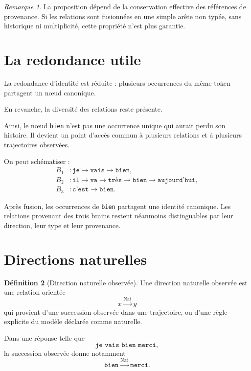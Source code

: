 \documentclass[11pt,a4paper]{report}
\theoremstyle{definition}
\newtheorem{definition}{Définition}[chapter]
\theoremstyle{plain}
\theoremstyle{remark}
\newtheorem{remarque}[definition]{Remarque}
\begin{document}
\begin{remarque}
La proposition dépend de la conservation effective des références
de provenance. Si les relations sont fusionnées en une simple
arête non typée, sans historique ni multiplicité, cette propriété
n'est plus garantie.
\end{remarque}

\section{La redondance utile}

La redondance d'identité est réduite :
plusieurs occurrences du même token partagent un nœud canonique.

En revanche, la diversité des relations reste présente.

Ainsi, le nœud \texttt{bien} n'est pas une occurrence unique
qui aurait perdu son histoire. Il devient un point d'accès commun
à plusieurs relations et à plusieurs trajectoires observées.

On peut schématiser :
\[
\begin{aligned}
B_1 &: \texttt{je}\to\texttt{vais}\to\texttt{bien},\\
B_2 &: \texttt{il}\to\texttt{va}\to\texttt{très}
       \to\texttt{bien}\to\texttt{aujourd'hui},\\
B_3 &: \texttt{c'est}\to\texttt{bien}.
\end{aligned}
\]

Après fusion, les occurrences de \texttt{bien} partagent une
identité canonique. Les relations provenant des trois brains
restent néanmoins distinguables par leur direction, leur type
et leur provenance.

\section{Directions naturelles}

\begin{definition}[Direction naturelle observée]
Une direction naturelle observée est une relation orientée
\[
x\overset{\mathrm{Nat}}{\longrightarrow}y
\]
qui provient d'une succession observée dans une trajectoire,
ou d'une règle explicite du modèle déclarée comme naturelle.
\end{definition}

Dans une réponse telle que
\[
\texttt{je vais bien merci},
\]
la succession observée donne notamment
\[
\texttt{bien}
\overset{\mathrm{Nat}}{\longrightarrow}
\texttt{merci}.
\]
\end{document}
